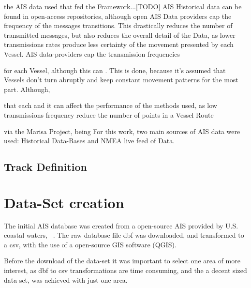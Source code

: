 the AIS data used that fed the Framework...[TODO]
AIS Historical data can be found in open-access repositories, although open AIS Data providers cap the frequency of the messages transitions. This drastically reduces the number of transmitted messages, but also reduces the overall detail of the Data, as lower transmissions rates produce less certainty of the movement presented by each Vessel. AIS data-providers cap the transmission frequencies

for each Vessel, although this can . This is done, because it's assumed that Vessels don't turn abruptly and keep constant movement patterns for the most part.
Although, 


that each and it can affect the performance of the methods used, as low transmissions frequency reduce the number of points in a Vessel Route  

via the Marisa Project, being For this work, two main sources of AIS data were used: Historical Data-Bases and NMEA live feed of Data. 

\subsection{Track Definition}



\section{Data-Set creation} %

The initial AIS database was created from a open-source AIS provided by U.S. coastal waters, ~\cite{MarineCadastre}. The raw database file dbf was downloaded, and transformed to a csv, with the use of a open-source GIS software (QGIS). 
 
Before the download of the data-set it was important to select one area of more interest, as dbf to csv transformations are time consuming, and the a decent sized data-set, was achieved with just one area.


